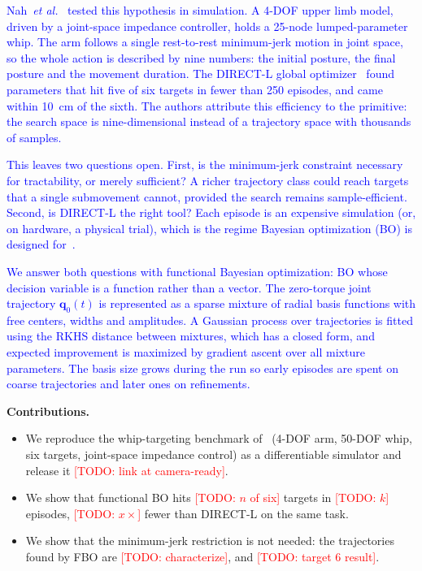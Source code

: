 \documentclass[letterpaper, 10 pt, conference]{ieeeconf}
\newcommand{\todo}[1]{\textcolor{red}{[TODO: #1]}}
\newcommand{\draft}[1]{\textcolor{blue}{#1}}
\newcommand{\vq}{\mathbf{q}}
\begin{document}
\draft{
Nah~\emph{et al.}~\cite{nah2023whip} tested this hypothesis in simulation. A
4-DOF upper limb model, driven by a joint-space impedance controller, holds a
25-node lumped-parameter whip. The arm follows a single rest-to-rest
minimum-jerk motion in joint space, so the whole action is described by nine
numbers: the initial posture, the final posture and the movement duration. The
DIRECT-L global optimizer~\cite{gablonsky2001direct} found parameters that hit
five of six targets in fewer than 250 episodes, and came within 10~cm of the
sixth. The authors attribute this efficiency to the primitive: the search space
is nine-dimensional instead of a trajectory space with thousands of samples.
}

\draft{
This leaves two questions open. First, is the minimum-jerk constraint necessary
for tractability, or merely sufficient? A richer trajectory class could reach
targets that a single submovement cannot, provided the search remains
sample-efficient. Second, is DIRECT-L the right tool? Each episode is an
expensive simulation (or, on hardware, a physical trial), which is the regime
Bayesian optimization (BO) is designed for~\cite{shahriari2016bo,frazier2018bo}.
}

\draft{
We answer both questions with functional Bayesian optimization: BO whose
decision variable is a function rather than a vector. The zero-torque joint
trajectory $\vq_0(t)$ is represented as a sparse mixture of radial basis
functions with free centers, widths and amplitudes. A Gaussian process over
trajectories is fitted using the RKHS distance between mixtures, which has a
closed form, and expected improvement is maximized by gradient ascent over all
mixture parameters. The basis size grows during the run so early episodes are
spent on coarse trajectories and later ones on refinements.
}

\noindent\textbf{Contributions.}
\begin{itemize}
  \item We reproduce the whip-targeting benchmark of~\cite{nah2023whip}
  (4-DOF arm, 50-DOF whip, six targets, joint-space impedance control) as a
  differentiable simulator and release it \todo{link at camera-ready}.
  \item We show that functional BO hits \todo{$n$ of six} targets in
  \todo{$k$} episodes, \todo{$x\times$} fewer than DIRECT-L on the same task.
  \item We show that the minimum-jerk restriction is not needed: the trajectories
  found by FBO are \todo{characterize}, and \todo{target 6 result}.
\end{itemize}
\end{document}
